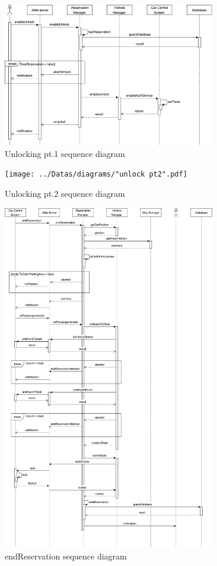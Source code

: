 \begin{figure}[H]
        \includegraphics[width=350px]{../Datas/diagrams/unlock.pdf}
        \caption{Unlocking pt.1 sequence diagram}
        \label{fig:unlock-pt1-seq-dig}
\end{figure}

\begin{figure}[H]
        \texttt{[image: ../Datas/diagrams/"unlock pt2".pdf]}
        \caption{Unlocking pt.2 sequence diagram}
        \label{fig:unlock-pt2-seq-dig}
\end{figure}

\begin{figure}[H]
        \includegraphics[width=350px]{../Datas/diagrams/endRide.pdf}
        \caption{endReservation sequence diagram}
        \label{fig:end-reserv-seq-dig}
\end{figure}
